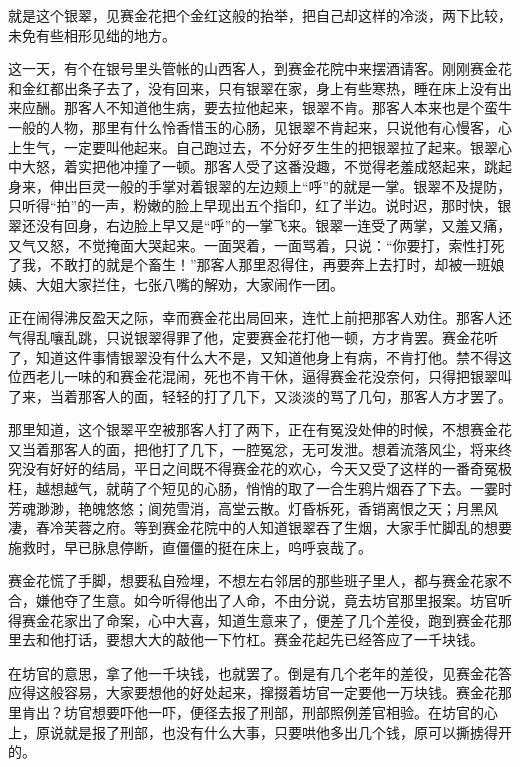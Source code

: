 \documentclass[12pt,UTF8]{ctexbook}
\begin{document}
{{{就是这个银翠，见赛金花把个金红这般的抬举，把自己却这样的冷淡，两下比较，未免有些相形见绌的地方。

这一天，有个在银号里头管帐的山西客人，到赛金花院中来摆酒请客。刚刚赛金花和金红都出条子去了，没有回来，只有银翠在家，身上有些寒热，睡在床上没有出来应酬。那客人不知道他生病，要去拉他起来，银翠不肯。那客人本来也是个蛮牛一般的人物，那里有什么怜香惜玉的心肠，见银翠不肯起来，只说他有心慢客，心上生气，一定要叫他起来。自己跑过去，不分好歹生生的把银翠拉了起来。银翠心中大怒，着实把他冲撞了一顿。那客人受了这番没趣，不觉得老羞成怒起来，跳起身来，伸出巨灵一般的手掌对着银翠的左边颊上“呼”的就是一掌。银翠不及提防，只听得“拍”的一声，粉嫩的脸上早现出五个指印，红了半边。说时迟，那时快，银翠还没有回身，右边脸上早又是“呼”的一掌飞来。银翠一连受了两掌，又羞又痛，又气又怒，不觉掩面大哭起来。一面哭着，一面骂着，只说：“你要打，索性打死了我，不敢打的就是个畜生！”那客人那里忍得住，再要奔上去打时，却被一班娘姨、大姐大家拦住，七张八嘴的解劝，大家闹作一团。

正在闹得沸反盈天之际，幸而赛金花出局回来，连忙上前把那客人劝住。那客人还气得乱嚷乱跳，只说银翠得罪了他，定要赛金花打他一顿，方才肯罢。赛金花听了，知道这件事情银翠没有什么大不是，又知道他身上有病，不肯打他。禁不得这位西老儿一味的和赛金花混闹，死也不肯干休，逼得赛金花没奈何，只得把银翠叫了来，当着那客人的面，轻轻的打了几下，又淡淡的骂了几句，那客人方才罢了。

那里知道，这个银翠平空被那客人打了两下，正在有冤没处伸的时候，不想赛金花又当着那客人的面，把他打了几下，一腔冤忿，无可发泄。想着流落风尘，将来终究没有好好的结局，平日之间既不得赛金花的欢心，今天又受了这样的一番奇冤极枉，越想越气，就萌了个短见的心肠，悄悄的取了一合生鸦片烟吞了下去。一霎时芳魂渺渺，艳魄悠悠；阆苑雪消，高堂云散。灯昏柝死，香销离恨之天；月黑风凄，春冷芙蓉之府。等到赛金花院中的人知道银翠吞了生烟，大家手忙脚乱的想要施救时，早已脉息停断，直僵僵的挺在床上，呜呼哀哉了。

赛金花慌了手脚，想要私自殓埋，不想左右邻居的那些班子里人，都与赛金花家不合，嫌他夺了生意。如今听得他出了人命，不由分说，竟去坊官那里报案。坊官听得赛金花家出了命案，心中大喜，知道生意来了，便差了几个差役，跑到赛金花那里去和他打话，要想大大的敲他一下竹杠。赛金花起先已经答应了一千块钱。

在坊官的意思，拿了他一千块钱，也就罢了。倒是有几个老年的差役，见赛金花答应得这般容易，大家要想他的好处起来，撺掇着坊官一定要他一万块钱。赛金花那里肯出？坊官想要吓他一吓，便径去报了刑部，刑部照例差官相验。在坊官的心上，原说就是报了刑部，也没有什么大事，只要哄他多出几个钱，原可以撕掳得开的。

}}}
\end{document}
